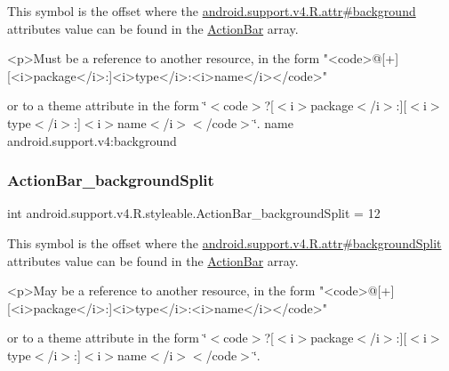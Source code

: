 This symbol is the offset where the \hyperlink{classandroid_1_1support_1_1v4_1_1R_1_1attr_a3aa8b955b1ba13d9d418c7ac9c23b291}{android.\+support.\+v4.\+R.\+attr\#background} attribute\textquotesingle{}s value can be found in the \hyperlink{classandroid_1_1support_1_1v4_1_1R_1_1styleable_adc5a3492b9c46265760d7120a04d6afa}{Action\+Bar} array.

\begin{DoxyVerb}      <p>Must be a reference to another resource, in the form "<code>@[+][<i>package</i>:]<i>type</i>:<i>name</i></code>"
\end{DoxyVerb}
 or to a theme attribute in the form \char`\"{}$<$code$>$?\mbox{[}$<$i$>$package$<$/i$>$\+:\mbox{]}\mbox{[}$<$i$>$type$<$/i$>$\+:\mbox{]}$<$i$>$name$<$/i$>$$<$/code$>$\char`\"{}.  name android.\+support.\+v4\+:background \mbox{\label{classandroid_1_1support_1_1v4_1_1R_1_1styleable_a13fc4682aff98cabdb455b8d50537f59}} 
\subsubsection{\texorpdfstring{Action\+Bar\+\_\+background\+Split}{ActionBar\_backgroundSplit}}
{\footnotesize\ttfamily int android.\+support.\+v4.\+R.\+styleable.\+Action\+Bar\+\_\+background\+Split = 12\hspace{0.3cm}{\ttfamily [static]}}

This symbol is the offset where the \hyperlink{classandroid_1_1support_1_1v4_1_1R_1_1attr_accf7c5a5b1116cb065de3d8e2451c213}{android.\+support.\+v4.\+R.\+attr\#background\+Split} attribute\textquotesingle{}s value can be found in the \hyperlink{classandroid_1_1support_1_1v4_1_1R_1_1styleable_adc5a3492b9c46265760d7120a04d6afa}{Action\+Bar} array.

\begin{DoxyVerb}      <p>May be a reference to another resource, in the form "<code>@[+][<i>package</i>:]<i>type</i>:<i>name</i></code>"
\end{DoxyVerb}
 or to a theme attribute in the form \char`\"{}$<$code$>$?\mbox{[}$<$i$>$package$<$/i$>$\+:\mbox{]}\mbox{[}$<$i$>$type$<$/i$>$\+:\mbox{]}$<$i$>$name$<$/i$>$$<$/code$>$\char`\"{}. 

